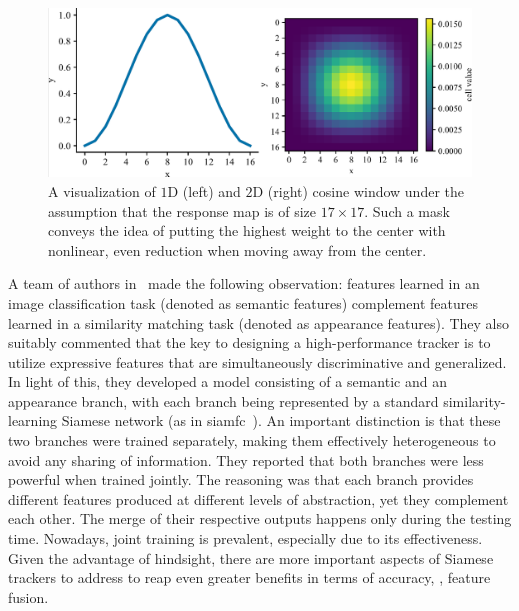 \begin{figure}[!t]
    \centerline{\includegraphics[width=0.8\linewidth]{figures/theoretical_foundations/cosine_window.pdf}}
    \caption[Cosine window]{A visualization of $1$D (left) and $2$D (right) cosine window under the assumption that the response map is of size $17 \times 17$. Such a mask conveys the idea of putting the highest weight to the center with nonlinear, even reduction when moving away from the center.}
    \label{fig:CosineWindow}
\end{figure}

A team of authors in~\cite{he2018twofoldsiam} made the following observation: features learned in an image classification task (denoted as semantic features) complement features learned in a similarity matching task (denoted as appearance features). They also suitably commented that the key to designing a high-performance tracker is to utilize expressive features that are simultaneously discriminative and generalized. In light of this, they developed a model consisting of a semantic and an appearance branch, with each branch being represented by a standard similarity-learning Siamese network (as in \gls{siamfc}~\cite{bertinetto2016siamfc}). An important distinction is that these two branches were trained separately, making them effectively heterogeneous to avoid any sharing of information. They reported that both branches were less powerful when trained jointly. The reasoning was that each branch provides different features produced at different levels of abstraction, yet they complement each other. The merge of their respective outputs happens only during the testing time. Nowadays, joint training is prevalent, especially due to its effectiveness. Given the advantage of hindsight, there are more important aspects of Siamese trackers to address to reap even greater benefits in terms of accuracy, \egtext{}, feature fusion.


